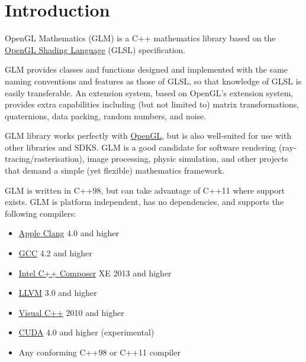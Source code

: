 \documentclass{scrartcl}
\numberwithin{figure}{subsection}
\begin{document}
\pagebreak{}

\tableofcontents{}

\pagebreak{}

\section*{Introduction}

OpenGL Mathematics (GLM) is a C++ mathematics library based on the \href{https://www.opengl.org/documentation/glsl/}{OpenGL Shading Language} (GLSL) specification.

GLM provides classes and functions designed and implemented with the same naming conventions and features as those of GLSL, so that knowledge of GLSL is easily transferable.  An extension system, based on OpenGL's extension system, provides extra capabilities including (but not limited to) matrix transformations, quaternions, data packing, random numbers, and noise.

GLM library works perfectly with \href{http://www.opengl.org}{OpenGL}, but is also well-suited for use with other libraries and SDKS. GLM is a good candidate for software rendering (ray-tracing/rasterisation), image processing, physic simulation, and other projects that demand a simple (yet flexible) mathematics framework.

GLM is written in C++98, but can take advantage of C++11 where support exists. GLM is platform independent, has no dependencies, and supports the following compilers:

\begin{itemize}
  \item \href{https://developer.apple.com/Library/mac/documentation/CompilerTools/Conceptual/LLVMCompilerOverview/index.html}{Apple Clang} 4.0 and higher
  \item \href{http://gcc.gnu.org/}{GCC} 4.2 and higher
  \item \href{https://software.intel.com/en-us/intel-compilers}{Intel C++ Composer} XE 2013 and higher
  \item \href{http://llvm.org/}{LLVM} 3.0 and higher
  \item \href{http://www.visualstudio.com/}{Visual C++} 2010 and higher
  \item \href{https://developer.nvidia.com/about-cuda}{CUDA} 4.0 and higher (experimental)
  \item Any conforming C++98 or C++11 compiler
\end{itemize}
\end{document}

